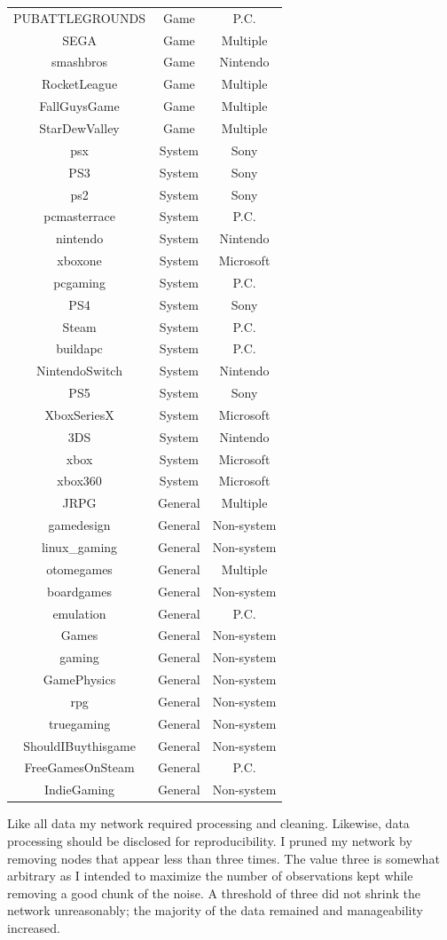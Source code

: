 \documentclass[12pt, a4paper]{article}
\begin{document}
\begin{longtable} {c c c}
    PUBATTLEGROUNDS & Game & P.C. \\
    SEGA & Game & Multiple \\
    smashbros & Game & Nintendo \\
    RocketLeague & Game & Multiple \\
    FallGuysGame & Game & Multiple \\
    StarDewValley & Game & Multiple \\
    psx & System & Sony \\
    PS3 & System & Sony \\
    ps2 & System & Sony \\
    pcmasterrace & System & P.C. \\
    nintendo & System & Nintendo \\
    xboxone & System & Microsoft \\
    pcgaming & System & P.C. \\
    PS4 & System & Sony \\
    Steam & System & P.C. \\
    buildapc & System & P.C. \\
    NintendoSwitch & System & Nintendo \\
    PS5 & System & Sony \\
    XboxSeriesX & System & Microsoft \\
    3DS & System & Nintendo \\
    xbox & System & Microsoft \\
    xbox360 & System & Microsoft \\
    JRPG & General & Multiple \\
    gamedesign & General & Non-system \\
    linux\_gaming & General & Non-system \\
    otomegames & General & Multiple \\
    boardgames & General & Non-system \\
    emulation & General & P.C. \\
    Games & General & Non-system \\
    gaming & General & Non-system \\
    GamePhysics & General & Non-system \\
    rpg & General & Non-system \\
    truegaming & General & Non-system \\
    ShouldIBuythisgame & General & Non-system \\
    FreeGamesOnSteam & General & P.C. \\
    IndieGaming & General & Non-system \\
  \end{longtable}
Like all data my network required processing and cleaning. Likewise, data processing should be disclosed for reproducibility. I pruned my network by removing nodes that appear less than three times. The value three is somewhat arbitrary as I intended to maximize the number of observations kept while removing a good chunk of the noise. A threshold of three did not shrink the network unreasonably; the majority of the data remained and manageability increased.
\end{document}
